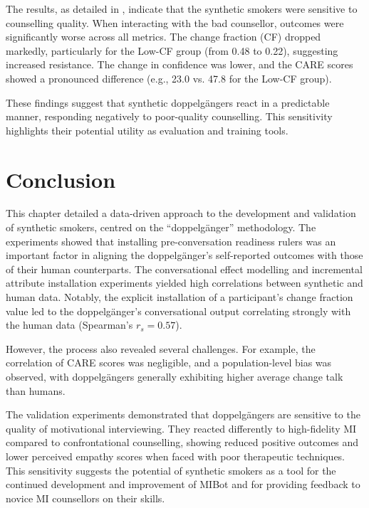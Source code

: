 The results, as detailed in , indicate that the synthetic smokers were sensitive to counselling quality. When interacting with the bad counsellor, outcomes were significantly worse across all metrics. The change fraction (CF) dropped markedly, particularly for the Low-CF group (from 0.48 to 0.22), suggesting increased resistance. The change in confidence was lower, and the CARE scores showed a pronounced difference (e.g., 23.0 vs. 47.8 for the Low-CF group).

These findings suggest that synthetic doppelgängers react in a predictable manner, responding negatively to poor-quality counselling. This sensitivity highlights their potential utility as evaluation and training tools.

\section{Conclusion}

This chapter detailed a data-driven approach to the development and validation of synthetic smokers, centred on the ``doppelgänger'' methodology. The experiments showed that installing pre-conversation readiness rulers was an important factor in aligning the doppelgänger's self-reported outcomes with those of their human counterparts. The conversational effect modelling and incremental attribute installation experiments yielded high correlations between synthetic and human data. Notably, the explicit installation of a participant's change fraction value led to the doppelgänger's conversational output correlating strongly with the human data (Spearman's $r_{s}=0.57$).

However, the process also revealed several challenges. For example, the correlation of CARE scores was negligible, and a population-level bias was observed, with doppelgängers generally exhibiting higher average change talk than humans.

The validation experiments demonstrated that doppelgängers are sensitive to the quality of motivational interviewing. They reacted differently to high-fidelity MI compared to confrontational counselling, showing reduced positive outcomes and lower perceived empathy scores when faced with poor therapeutic techniques. This sensitivity suggests the potential of synthetic smokers as a tool for the continued development and improvement of MIBot and for providing feedback to novice MI counsellors on their skills.